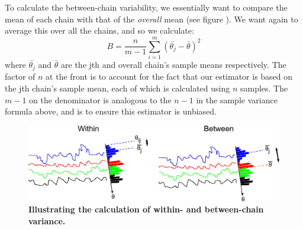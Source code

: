 \documentclass[11pt,fullpage]{book}
\begin{document}
To calculate the between-chain variability, we essentially want to compare the mean of each chain with that of the \textit{overall} mean (see figure ). We want again to average this over all the chains, and so we calculate: 
%
\begin{equation}
B = \frac{n}{m-1}\sum\limits_{i=1}^{m}(\bar{\theta_j} - \bar{\theta})^2
\end{equation}
%
where $\bar{\theta_j}$ and $\bar{\theta}$ are the jth and overall chain's sample means respectively. The factor of $n$ at the front is to account for the fact that our estimator is based on the jth chain's sample mean, each of which is calculated using $n$ samples. The $m-1$ on the denominator is analogous to the $n-1$ in the sample variance formula above, and is to ensure this estimator is unbiased.

\begin{figure}
\centerline{\includegraphics[width=1\textwidth]{metropolisHastings_withinBetweenExplicit.pdf}}
\caption{\textbf{Illustrating the calculation of within- and between-chain variance.}}\label{fig:metropolisHastings_withinBetweenExplicit}
\end{figure}
\end{document}
